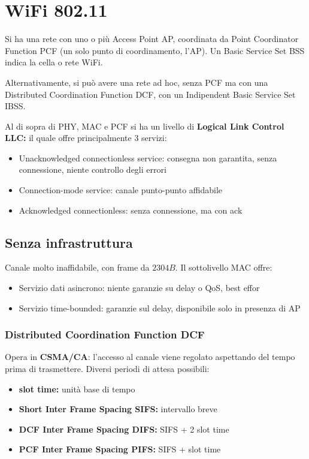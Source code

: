 \section{WiFi 802.11}

Si ha una rete con uno o più Access Point AP, coordinata da Point Coordinator Function PCF (un solo punto di coordinamento, l'AP). Un Basic Service Set BSS indica la cella o rete WiFi.

Alternativamente, si può avere una rete ad hoc, senza PCF ma con una Distributed Coordination Function DCF, con un Indipendent Basic Service Set IBSS.

Al di sopra di PHY, MAC e PCF si ha un livello di \textbf{Logical Link Control LLC:} il quale offre principalmente 3 servizi: 
\begin{itemize}
    \item Unacknowledged connectionless service: consegna non garantita, senza connessione, niente controllo degli errori 
    
    \item Connection-mode service: canale punto-punto affidabile
    
    \item Acknowledged connectionless: senza connessione, ma con ack
\end{itemize}

\subsection{Senza infrastruttura}

Canale molto inaffidabile, con frame da $2304B$. Il sottolivello MAC offre: 
\begin{itemize}
    \item Servizio dati asincrono: niente garanzie su delay o QoS, best effor
    
    \item Servizio time-bounded: garanzie sul delay, disponibile solo in presenza di AP
\end{itemize}

\subsubsection{Distributed Coordination Function DCF}

Opera in \textbf{CSMA/CA}: l'accesso al canale viene regolato aspettando del tempo prima di trasmettere. Diversi periodi di attesa possibili: 
\begin{itemize}
    \item \textbf{slot time:} unità base di tempo
    
    \item \textbf{Short Inter Frame Spacing SIFS:} intervallo breve
    
    \item \textbf{DCF Inter Frame Spacing DIFS:} SIFS + 2 slot time
    
    \item \textbf{PCF Inter Frame Spacing PIFS:} SIFS + slot time
\end{itemize}

